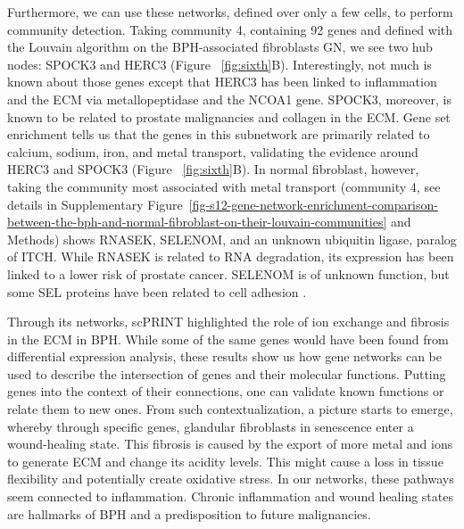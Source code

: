 Furthermore, we can use these networks, defined over only a few cells, to perform community detection. Taking community 4, containing 92 genes and defined with the Louvain algorithm on the \gls{BPH}-associated fibroblasts \gls{GN}, we see two hub nodes: SPOCK3 and HERC3 (Figure ~\ref{fig:sixth}B). Interestingly, not much is known about those genes except that HERC3 has been linked to inflammation and the \gls{ECM} via metallopeptidase and the NCOA1 gene\citep{liAccumulationNCOA1Dependent2023}. SPOCK3, moreover, is known to be related to prostate malignancies and collagen in the \gls{ECM}\citep{luoMechanismPrognosticMarker2023}. Gene set enrichment tells us that the genes in this subnetwork are primarily related to calcium, sodium, iron, and metal transport, validating the evidence around HERC3 and SPOCK3 (Figure ~\ref{fig:sixth}B). In normal fibroblast, however, taking the community most associated with metal transport  (community 4, see details in Supplementary Figure~\ref{fig-s12-gene-network-enrichment-comparison-between-the-bph-and-normal-fibroblast-on-their-louvain-communities} and Methods) shows RNASEK, SELENOM, and an unknown ubiquitin ligase, paralog of ITCH. While RNASEK is related to RNA degradation, its expression has been linked to a lower risk of prostate cancer\citep{kladi-skandaliExpressionalProfilingClinical2018}.  SELENOM is of unknown function, but some SEL proteins have been related to cell adhesion\citep{SelenoproteinDeficiencyAlters} . 

Through its networks, \gls{scPRINT} highlighted the role of ion exchange and fibrosis in the \gls{ECM} in \gls{BPH}. While some of the same genes would have been found from differential expression analysis, these results show us how gene networks can be used to describe the intersection of genes and their molecular functions. Putting genes into the context of their connections, one can validate known functions or relate them to new ones. From such contextualization, a picture starts to emerge, whereby through specific genes, glandular fibroblasts in senescence enter a wound-healing state. This fibrosis is caused by the export of more metal and ions to generate \gls{ECM} and change its acidity levels. This might cause a loss in tissue flexibility and potentially create oxidative stress\citep{EffectPHExtracellular}. In our networks, these pathways seem connected to inflammation. Chronic inflammation and wound healing states are hallmarks of \gls{BPH} and a predisposition to future malignancies\citep{colottaCancerrelatedInflammationSeventh2009,hanahanHallmarksCancerNext2011}.

